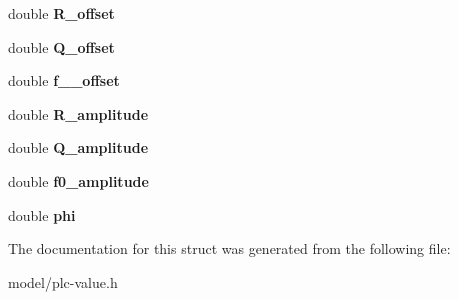 \begin{DoxyCompactItemize}
\item 
\hypertarget{structns3_1_1PLC__TimeVariantFreqSelectiveValue_1_1PLC__TimeVariantParamSet_a8be3dd19c13e1141f8a17376c8a9278a}{double {\bfseries \-R\-\_\-offset}}\label{structns3_1_1PLC__TimeVariantFreqSelectiveValue_1_1PLC__TimeVariantParamSet_a8be3dd19c13e1141f8a17376c8a9278a}

\item 
\hypertarget{structns3_1_1PLC__TimeVariantFreqSelectiveValue_1_1PLC__TimeVariantParamSet_a178a0d2a00a4dc11521994d2c756c725}{double {\bfseries \-Q\-\_\-offset}}\label{structns3_1_1PLC__TimeVariantFreqSelectiveValue_1_1PLC__TimeVariantParamSet_a178a0d2a00a4dc11521994d2c756c725}

\item 
\hypertarget{structns3_1_1PLC__TimeVariantFreqSelectiveValue_1_1PLC__TimeVariantParamSet_acd2b28b34a38dc02c6b172072cbd04ef}{double {\bfseries f\-\_\-\_\-offset}}\label{structns3_1_1PLC__TimeVariantFreqSelectiveValue_1_1PLC__TimeVariantParamSet_acd2b28b34a38dc02c6b172072cbd04ef}

\item 
\hypertarget{structns3_1_1PLC__TimeVariantFreqSelectiveValue_1_1PLC__TimeVariantParamSet_a42127b0f9695ec6447ff34ba49aff62f}{double {\bfseries \-R\-\_\-amplitude}}\label{structns3_1_1PLC__TimeVariantFreqSelectiveValue_1_1PLC__TimeVariantParamSet_a42127b0f9695ec6447ff34ba49aff62f}

\item 
\hypertarget{structns3_1_1PLC__TimeVariantFreqSelectiveValue_1_1PLC__TimeVariantParamSet_a6a54a6b9b3b261cc63c6dcaa5a540345}{double {\bfseries \-Q\-\_\-amplitude}}\label{structns3_1_1PLC__TimeVariantFreqSelectiveValue_1_1PLC__TimeVariantParamSet_a6a54a6b9b3b261cc63c6dcaa5a540345}

\item 
\hypertarget{structns3_1_1PLC__TimeVariantFreqSelectiveValue_1_1PLC__TimeVariantParamSet_ae624277aaa5a8c3c442e2a7c65d9dce1}{double {\bfseries f0\-\_\-amplitude}}\label{structns3_1_1PLC__TimeVariantFreqSelectiveValue_1_1PLC__TimeVariantParamSet_ae624277aaa5a8c3c442e2a7c65d9dce1}

\item 
\hypertarget{structns3_1_1PLC__TimeVariantFreqSelectiveValue_1_1PLC__TimeVariantParamSet_a7d867ab0f9d8855f6141b233973cfbaa}{double {\bfseries phi}}\label{structns3_1_1PLC__TimeVariantFreqSelectiveValue_1_1PLC__TimeVariantParamSet_a7d867ab0f9d8855f6141b233973cfbaa}

\end{DoxyCompactItemize}


\-The documentation for this struct was generated from the following file\-:\begin{DoxyCompactItemize}
\item 
model/plc-\/value.\-h\end{DoxyCompactItemize}

